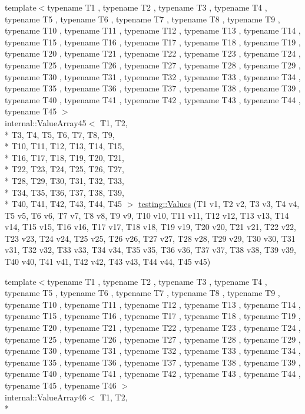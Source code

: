 \begin{DoxyCompactItemize}
{\footnotesize template$<$typename T1 , typename T2 , typename T3 , typename T4 , typename T5 , typename T6 , typename T7 , typename T8 , typename T9 , typename T10 , typename T11 , typename T12 , typename T13 , typename T14 , typename T15 , typename T16 , typename T17 , typename T18 , typename T19 , typename T20 , typename T21 , typename T22 , typename T23 , typename T24 , typename T25 , typename T26 , typename T27 , typename T28 , typename T29 , typename T30 , typename T31 , typename T32 , typename T33 , typename T34 , typename T35 , typename T36 , typename T37 , typename T38 , typename T39 , typename T40 , typename T41 , typename T42 , typename T43 , typename T44 , typename T45 $>$ }\\internal\-::\-Value\-Array45$<$ T1, T2, \\*
T3, T4, T5, T6, T7, T8, T9, \\*
T10, T11, T12, T13, T14, T15, \\*
T16, T17, T18, T19, T20, T21, \\*
T22, T23, T24, T25, T26, T27, \\*
T28, T29, T30, T31, T32, T33, \\*
T34, T35, T36, T37, T38, T39, \\*
T40, T41, T42, T43, T44, T45 $>$ \hyperlink{namespacetesting_a227b4b3b251f5f4aa0e1261c27fe9dd4}{testing\-::\-Values} (T1 v1, T2 v2, T3 v3, T4 v4, T5 v5, T6 v6, T7 v7, T8 v8, T9 v9, T10 v10, T11 v11, T12 v12, T13 v13, T14 v14, T15 v15, T16 v16, T17 v17, T18 v18, T19 v19, T20 v20, T21 v21, T22 v22, T23 v23, T24 v24, T25 v25, T26 v26, T27 v27, T28 v28, T29 v29, T30 v30, T31 v31, T32 v32, T33 v33, T34 v34, T35 v35, T36 v36, T37 v37, T38 v38, T39 v39, T40 v40, T41 v41, T42 v42, T43 v43, T44 v44, T45 v45)
\item 
{\footnotesize template$<$typename T1 , typename T2 , typename T3 , typename T4 , typename T5 , typename T6 , typename T7 , typename T8 , typename T9 , typename T10 , typename T11 , typename T12 , typename T13 , typename T14 , typename T15 , typename T16 , typename T17 , typename T18 , typename T19 , typename T20 , typename T21 , typename T22 , typename T23 , typename T24 , typename T25 , typename T26 , typename T27 , typename T28 , typename T29 , typename T30 , typename T31 , typename T32 , typename T33 , typename T34 , typename T35 , typename T36 , typename T37 , typename T38 , typename T39 , typename T40 , typename T41 , typename T42 , typename T43 , typename T44 , typename T45 , typename T46 $>$ }\\internal\-::\-Value\-Array46$<$ T1, T2, \\*

\end{DoxyCompactItemize}
